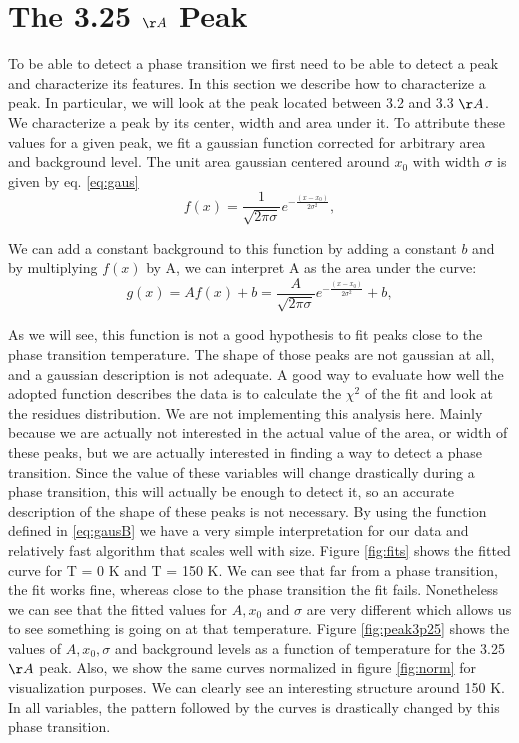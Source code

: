 

\section{The 3.25 $\AA$ Peak } \label{Peak}
	To be able to detect a phase transition we first need to be able to detect a peak and characterize its features. In this section we describe how to characterize a peak. In particular, we will look at the peak located between 3.2 and 3.3 ${\AA}$.
	We characterize a peak by its center, width and area under it. To attribute these values for a given peak, we fit a gaussian function corrected for arbitrary area and background level. The unit area gaussian centered around $x_{0}$ with width $\sigma$ is given by eq. \ref{eq:gaus}
	\begin{equation} \label{eq:gaus}
	f(x) = \frac{1}{\sqrt{2\pi \sigma}} e^{-\frac{(x - x_{0})}{2\sigma^{2}} },
	\end{equation}
	
	We can add a constant background to this function by adding a constant $b$ and by multiplying $f(x)$ by A, we can interpret A as the area under the curve:
	\begin{equation} \label{eq:gausB}
	g(x) = Af(x) + b = \frac{A}{\sqrt{2\pi \sigma}} e^{-\frac{(x - x_{0})}{2\sigma^{2}} } + b,
	\end{equation}
	
	As we will see, this function is not a good hypothesis to fit peaks close to the phase transition temperature. The shape of those peaks are not gaussian at all, and a gaussian description is not adequate. A good way to evaluate how well the adopted function describes the data is to calculate the $\chi^{2}$ of the fit and look at the residues distribution. We are not implementing this analysis here. Mainly because we are actually not interested in the actual value of the area, or width of these peaks, but we are actually interested in finding a way to detect a phase transition. 
	Since the value of these variables will change drastically during a phase transition, this will actually be enough to detect it, so an accurate description of the shape of these peaks is not necessary. By using the function defined in \ref{eq:gausB} we have a very simple interpretation for our data and relatively fast algorithm that scales well with size.
	Figure \ref{fig:fits} shows the fitted curve for T = 0 K and T = 150 K. We can see that far from a phase transition, the fit works fine, whereas close to the phase transition the fit fails. Nonetheless we can see that the fitted values for $A, x_{0} \textrm{ and } \sigma$ are very different which allows us to see something is going on at that temperature.
	Figure \ref{fig:peak3p25} shows the values of $A, x_{0}, \sigma$ and background levels as a function of temperature for the 3.25 $\AA$ peak. Also, we show the same curves normalized in figure \ref{fig:norm} for visualization purposes.
	We can clearly see an interesting structure around 150 K. In all variables, the pattern followed by the curves is drastically changed by this phase transition.
	
